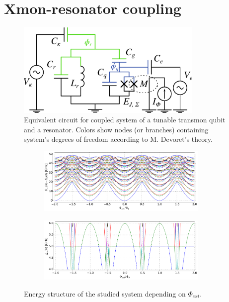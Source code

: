 \documentclass[12pt]{report}
\numberwithin{equation}{section}
\begin{document}
\chapter{Xmon-resonator coupling}

\begin{figure}
\centering
\includegraphics[width=0.8\textwidth]{xmon_resonator}
\caption{Equivalent circuit for coupled system of a tunable transmon qubit and a resonator. Colors show nodes (or branches) containing system's degrees of freedom according to M. Devoret's theory\cite{Devoret1995}.}
\label{fig:xmon-resonator}
\end{figure}
\begin{figure}
\centering
\begin{subfigure}[t]{\textwidth}
\centering
\includegraphics[width=0.9\textwidth]{levels}
\end{subfigure}

\begin{subfigure}[t]{\textwidth}
\centering
\includegraphics[width=0.9\textwidth]{freqs}
\end{subfigure}
\caption{Energy structure of the studied system depending on $\Phi_{ext}$.}
\label{fig:levels}
\end{figure}
\end{document}
